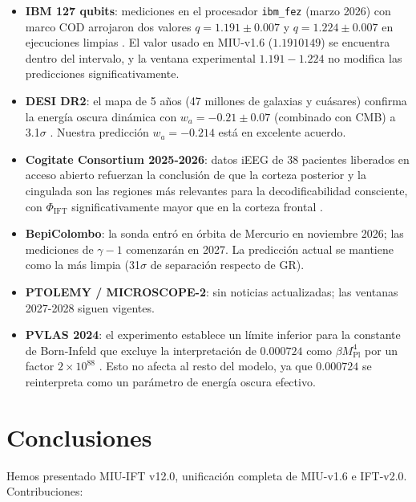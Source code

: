 \documentclass[12pt, a4paper]{article}
\theoremstyle{miuThm}
\theoremstyle{remark}
\newcommand{\eps}{0.000724}
\begin{document}
\begin{itemize}
\item \textbf{IBM 127 qubits}: mediciones en el procesador \texttt{ibm\_fez} (marzo 2026) con marco COD arrojaron dos valores $q = 1.191\pm0.007$ y $q = 1.224\pm0.007$ en ejecuciones limpias \cite{IBM2026}. El valor usado en MIU-v1.6 ($1.1910149$) se encuentra dentro del intervalo, y la ventana experimental $1.191-1.224$ no modifica las predicciones significativamente.
\item \textbf{DESI DR2}: el mapa de 5 años (47 millones de galaxias y cuásares) confirma la energía oscura dinámica con $w_a = -0.21\pm0.07$ (combinado con CMB) a 3.1$\sigma$ \cite{DESI2025}. Nuestra predicción $w_a=-0.214$ está en excelente acuerdo.
\item \textbf{Cogitate Consortium 2025-2026}: datos iEEG de 38 pacientes liberados en acceso abierto refuerzan la conclusión de que la corteza posterior y la cingulada son las regiones más relevantes para la decodificabilidad consciente, con $\Phi_{\text{IFT}}$ significativamente mayor que en la corteza frontal \cite{Cogitate2026}.
\item \textbf{BepiColombo}: la sonda entró en órbita de Mercurio en noviembre 2026; las mediciones de $\gamma-1$ comenzarán en 2027. La predicción actual se mantiene como la más limpia (31$\sigma$ de separación respecto de GR).
\item \textbf{PTOLEMY / MICROSCOPE-2}: sin noticias actualizadas; las ventanas 2027-2028 siguen vigentes.
\item \textbf{PVLAS 2024}: el experimento establece un límite inferior para la constante de Born-Infeld que excluye la interpretación de $\eps$ como $\beta M_{\text{Pl}}^4$ por un factor $2\times10^{88}$ \cite{DellaValle2024}. Esto no afecta al resto del modelo, ya que $\eps$ se reinterpreta como un parámetro de energía oscura efectivo.
\end{itemize}

\clearpage

\section{Conclusiones}
\label{sec:conclusiones}

Hemos presentado MIU-IFT v12.0, unificación completa de MIU-v1.6 e IFT-v2.0. Contribuciones:
\end{document}
